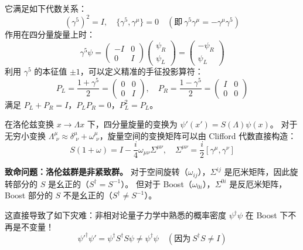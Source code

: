 它满足如下代数关系：
\begin{equation}
    (\gamma^5)^2 = I, \quad \{\gamma^5, \gamma^\mu\} = 0 \quad (\text{即} \ \gamma^5 \gamma^\mu = -\gamma^\mu \gamma^5)
\end{equation}
作用在四分量旋量上时：
\begin{equation}
    \gamma^5 \psi = \begin{pmatrix} -I & 0 \\ 0 & I \end{pmatrix} \begin{pmatrix} \psi_R \\ \psi_L \end{pmatrix} = \begin{pmatrix} -\psi_R \\ \psi_L \end{pmatrix}
\end{equation}
利用 $\gamma^5$ 的本征值 $\pm 1$，可以定义精准的手征投影算符：
\begin{equation}
    P_L = \frac{1 + \gamma^5}{2} = \begin{pmatrix} 0 & 0 \\ 0 & I \end{pmatrix}, \quad P_R = \frac{1 - \gamma^5}{2} = \begin{pmatrix} I & 0 \\ 0 & 0 \end{pmatrix}
\end{equation}
满足 $P_L + P_R = I$，$P_L P_R = 0$，$P_L^2 = P_L$。
\vspace{2ex}\par 
在洛伦兹变换 $x \to \Lambda x$ 下，四分量旋量的变换为 $\psi'(x') = S(\Lambda) \psi(x)$。
对于无穷小变换 $\Lambda^\mu_{\,\,\nu} \approx \delta^\mu_{\,\,\nu} + \omega^\mu_{\,\,\nu}$，旋量空间的变换矩阵可以由 Clifford 代数直接构造：
\begin{equation}
    S(1 + \omega) = I - \frac{i}{4} \omega_{\mu\nu} \Sigma^{\mu\nu}, \quad \Sigma^{\mu\nu} = \frac{i}{2}[\gamma^\mu, \gamma^\nu]
\end{equation}

\textbf{致命问题：洛伦兹群是非紧致群。}
对于空间旋转（$\omega_{ij}$），$\Sigma^{ij}$ 是厄米矩阵，因此旋转部分的 $S$ 是幺正的（$S^\dagger = S^{-1}$）。
但对于 Boost（$\omega_{0i}$），$\Sigma^{0i}$ 是反厄米矩阵，Boost 部分的 $S$ 不是幺正的（$S^\dagger \neq S^{-1}$）。

这直接导致了如下灾难：非相对论量子力学中熟悉的概率密度 $\psi^\dagger \psi$ 在 Boost 下不再是不变量！
\begin{equation}
    \psi'^\dagger \psi' = \psi^\dagger S^\dagger S \psi \neq \psi^\dagger \psi \quad (\text{因为} \ S^\dagger S \neq I)
\end{equation}

